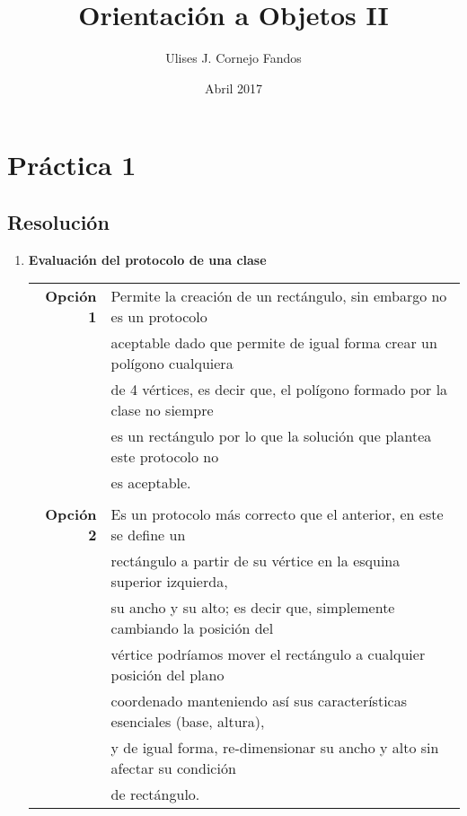 \documentclass[a4paper,10pt]{article}
\title{Orientación a Objetos II}
\author{Ulises J. Cornejo Fandos}
\date{Abril 2017}
\begin{document}
\maketitle

\section{Práctica 1}
\subsection{Resolución}

    \begin{enumerate}
        \item \textbf{Evaluación del protocolo de una clase}
        
            \begin{tabular}{r|l}
                \textbf{Opción 1} & Permite la creación de un rectángulo, sin embargo no es un protocolo \\
                & aceptable dado que permite de igual forma crear un polígono cualquiera \\
                & de 4 vértices, es decir que, el polígono formado por la clase no siempre \\
                & es un rectángulo por lo que la solución que plantea este protocolo no \\
                & es aceptable. \\
                & \\
            
                \textbf{Opción 2} & Es un protocolo más correcto que el anterior, en este se define un \\ 
                & rectángulo a partir de su vértice en la esquina superior izquierda, \\
                & su ancho y su alto; es decir que, simplemente cambiando la posición del \\
                & vértice podríamos mover el rectángulo a cualquier posición del plano \\ 
                & coordenado manteniendo así sus características esenciales (base, altura), \\
                & y de igual forma, re-dimensionar su ancho y alto sin afectar su condición \\
                & de rectángulo.  \\
            \end{tabular}
            

\end{enumerate}
\end{document}

